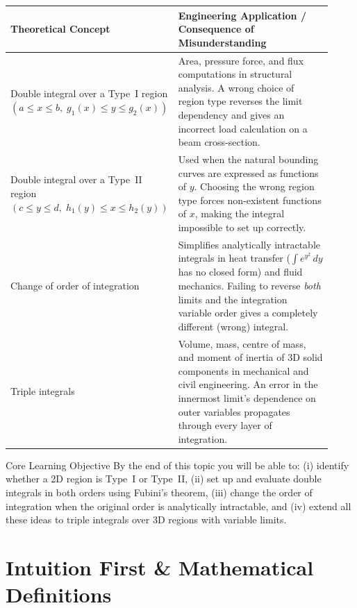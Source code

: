 \documentclass[12pt,a4paper]{article}
\begin{document}
\begin{center}
\begin{tabular}{@{}p{0.40\linewidth} p{0.52\linewidth}@{}}
\toprule
\textbf{Theoretical Concept} & \textbf{Engineering Application / Consequence of Misunderstanding} \\
\midrule
Double integral over a Type~I region \((a \le x \le b,\; g_1(x) \le y \le g_2(x))\) &
  Area, pressure force, and flux computations in structural analysis. A wrong choice of region type reverses the limit dependency and gives an incorrect load calculation on a beam cross-section. \\[4pt]
Double integral over a Type~II region \((c \le y \le d,\; h_1(y) \le x \le h_2(y))\) &
  Used when the natural bounding curves are expressed as functions of \(y\). Choosing the wrong region type forces non-existent functions of \(x\), making the integral impossible to set up correctly. \\[4pt]
Change of order of integration &
  Simplifies analytically intractable integrals in heat transfer (\(\int e^{y^2}\,dy\) has no closed form) and fluid mechanics. Failing to reverse \emph{both} limits and the integration variable order gives a completely different (wrong) integral. \\[4pt]
Triple integrals &
  Volume, mass, centre of mass, and moment of inertia of 3D solid components in mechanical and civil engineering. An error in the innermost limit's dependence on outer variables propagates through every layer of integration. \\
\bottomrule
\end{tabular}
\end{center}

\begin{learnbox}{Core Learning Objective}
By the end of this topic you will be able to: (i) identify whether a 2D region is Type~I or Type~II, (ii) set up and evaluate double integrals in both orders using Fubini's theorem, (iii) change the order of integration when the original order is analytically intractable, and (iv) extend all these ideas to triple integrals over 3D regions with variable limits.
\end{learnbox}

\section{Intuition First \& Mathematical Definitions}
\end{document}
